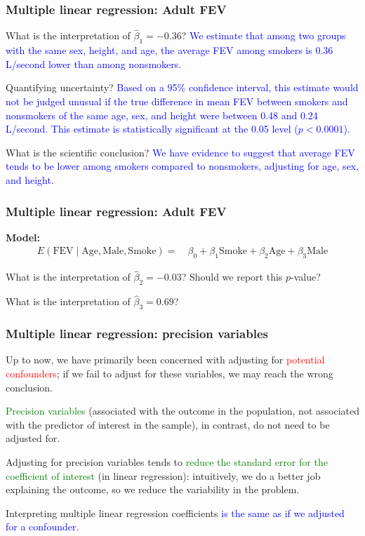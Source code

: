 \documentclass[12pt, 
hyperref={colorlinks=true, linkcolor=blue, urlcolor=cyan}]{beamer}
\begin{document}
\begin{frame}
\frametitle{Multiple linear regression: Adult FEV}

What is the interpretation of $\hat{\beta}_1 = -0.36$? \pause \textcolor{blue}{We estimate that among two groups with the same sex, height, and age, the average FEV among smokers is 0.36 L/second lower than among nonsmokers.}

Quantifying uncertainty? \pause \textcolor{blue}{Based on a 95\% confidence interval, this estimate would not be judged unusual if the true difference in mean FEV between smokers and nonsmokers of the same age, sex, and height were between 0.48 and 0.24 L/second. This estimate is statistically significant at the 0.05 level ($p < 0.0001$).}

What is the scientific conclusion? \pause \textcolor{blue}{We have evidence to suggest that average FEV tends to be lower among smokers compared to nonsmokers, adjusting for age, sex, and height.}
\end{frame}

\begin{frame}
\frametitle{Multiple linear regression: Adult FEV}
\vspace{-1cm}\textbf{Model:} {\small \begin{align*}
E(\text{FEV} \mid \text{Age}, \text{Male}, \text{Smoke}) =& \ \beta_0 + \beta_1 \text{Smoke} + \beta_2 \text{Age} + \beta_3 \text{Male} 
\end{align*} } \vspace{-1cm}

What is the interpretation of $\hat{\beta}_2 = -0.03$? Should we report this $p$-value? \vspace{1.5cm}

What is the interpretation of $\hat{\beta}_3 = 0.69$? \vspace{1.5cm}

\end{frame}

\begin{frame}
\frametitle{Multiple linear regression: precision variables}

Up to now, we have primarily been concerned with adjusting for \textcolor{red}{potential confounders}; if we fail to adjust for these variables, we may reach the wrong conclusion.

\textcolor{green}{Precision variables} (associated with the outcome in the population, not associated with the predictor of interest in the sample), in contrast, do not need to be adjusted for.

Adjusting for precision variables tends to \textcolor{green}{reduce the standard error for the coefficient of interest} (in linear regression): intuitively, we do a better job explaining the outcome, so we reduce the variability in the problem. 

Interpreting multiple linear regression coefficients \textcolor{blue}{is the same as if we adjusted for a confounder}.
\end{frame}
\end{document}
